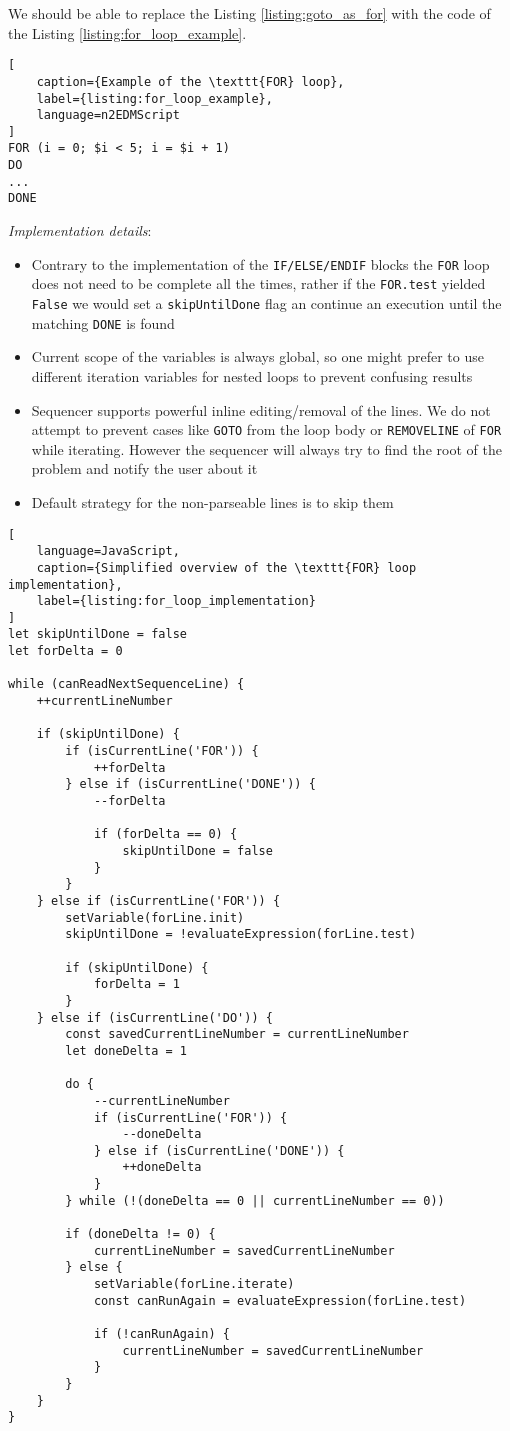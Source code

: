 We should be able to replace the Listing \ref{listing:goto_as_for} with the code of the Listing \ref{listing:for_loop_example}.
\begin{lstlisting}[
	caption={Example of the \texttt{FOR} loop}, 
	label={listing:for_loop_example},
	language=n2EDMScript
]
FOR (i = 0; $i < 5; i = $i + 1)
DO
...
DONE
\end{lstlisting}

\textit{Implementation details}: 

\begin{itemize}
	\item Contrary to the implementation of the \texttt{IF/ELSE/ENDIF} blocks the \texttt{FOR} loop does not need to be complete all the times, rather if the \texttt{FOR.test} yielded \texttt{False} we would set a \texttt{skipUntilDone} flag an continue an execution until the matching \texttt{DONE} is found
	\item Current scope of the variables is always global, so one might prefer to use different iteration variables for nested loops to prevent confusing results
	\item Sequencer supports powerful inline editing/removal of the lines. We do not attempt to prevent cases like \texttt{GOTO} from the loop body or \texttt{REMOVELINE} of \texttt{FOR} while iterating. However the sequencer will always try to find the root of the problem and notify the user about it
	\item Default strategy for the non-parseable lines is to skip them
\end{itemize}

\begin{lstlisting}[
	language=JavaScript, 
	caption={Simplified overview of the \texttt{FOR} loop implementation},
	label={listing:for_loop_implementation}
]
let skipUntilDone = false
let forDelta = 0

while (canReadNextSequenceLine) {
	++currentLineNumber

	if (skipUntilDone) {
		if (isCurrentLine('FOR')) {
			++forDelta
		} else if (isCurrentLine('DONE')) {
			--forDelta

			if (forDelta == 0) {
				skipUntilDone = false
			}
		}
	} else if (isCurrentLine('FOR')) {
		setVariable(forLine.init)
		skipUntilDone = !evaluateExpression(forLine.test)

		if (skipUntilDone) {
			forDelta = 1
		}
	} else if (isCurrentLine('DO')) {
		const savedCurrentLineNumber = currentLineNumber
		let doneDelta = 1

		do {
			--currentLineNumber
			if (isCurrentLine('FOR')) {
				--doneDelta
			} else if (isCurrentLine('DONE')) {
				++doneDelta
			}
		} while (!(doneDelta == 0 || currentLineNumber == 0))

		if (doneDelta != 0) {
			currentLineNumber = savedCurrentLineNumber
		} else {
			setVariable(forLine.iterate)
			const canRunAgain = evaluateExpression(forLine.test)

			if (!canRunAgain) {
				currentLineNumber = savedCurrentLineNumber
			}
		}
	}
}
\end{lstlisting}